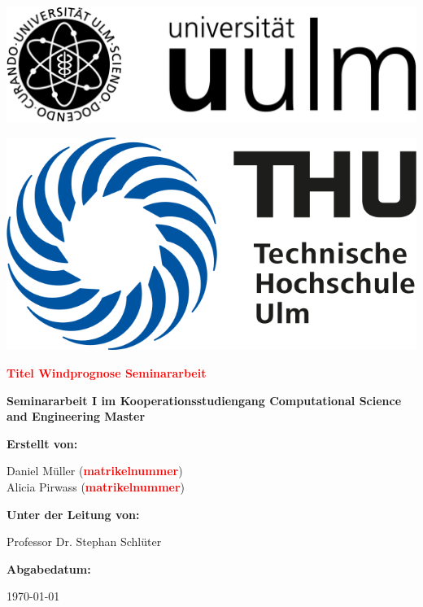 \documentclass[
12pt, %
toc=listofnumbered, %
toc=chapterentrydotfill, %
numbers=noenddot, %
captions=tableheading, %
]{scrreprt}
\newcommand{\highlight}[1]{\textbf{\textcolor{red}{#1}}}
\begin{document}
\begin{titlepage}
    \begin{center}
		\begin{minipage}[b]{\linewidth}
			\centering
			\begin{minipage}[b]{.4\linewidth}
				\includegraphics[width=.8\linewidth, left]{./images/logo_uu.png}
			\end{minipage}
			\hspace{.1\linewidth}%
			\begin{minipage}[b]{.4\linewidth}
				\includegraphics[width=.6\linewidth, right]{./images/logo_thu.png}
			\end{minipage}
		\end{minipage}
        
		\vspace{3cm}

        \Huge
        \textbf{\highlight{Titel Windprognose Seminararbeit}}
            
        \vspace{1.5cm}
        \large
        \textbf{Seminararbeit I im Kooperationsstudiengang Computational Science and Engineering Master}
    \end{center}        
	\vfill
	\large	
	\textbf{Erstellt von:}

	Daniel Müller (\highlight{matrikelnummer})\\
	Alicia Pirwass (\highlight{matrikelnummer})

	\vspace{1cm}
	\textbf{Unter der Leitung von:}

	Professor Dr. Stephan Schlüter

	\vspace{1cm}
	\textbf{Abgabedatum:}


	\today
            
    
\end{titlepage}
\end{document}
